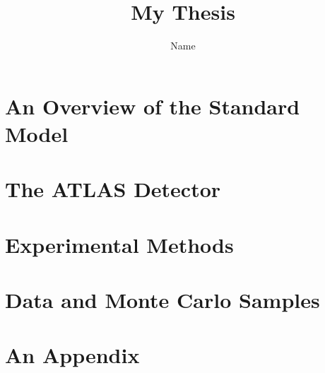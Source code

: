 \documentclass[thesis,openany]{./tex/thesis-umich}
\title{My Thesis}
\author{Name}
\begin{document}

\chapter{An Overview of the Standard Model} \label{chap:theory_chapter}
	 

\chapter{The ATLAS Detector} \label{chap:detector_chapter}
	 

\chapter{Experimental Methods} \label{chap:methods_chapter}
	 

\chapter{Data and Monte Carlo Samples} \label{chap:datamc_chapter}
	 


\appendix

\chapter{An Appendix} \label{app:example_appendix}
	


 


\end{document}
